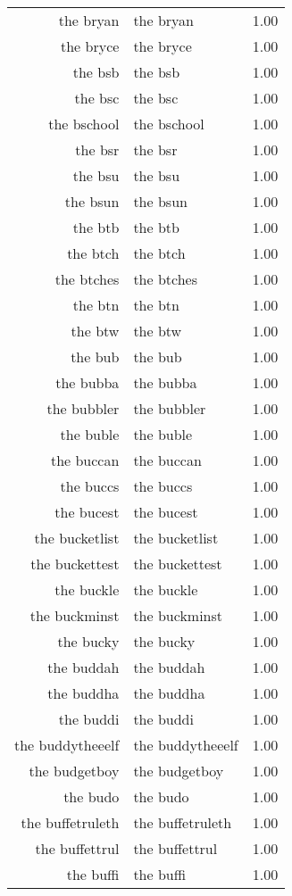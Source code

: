 \begin{table}[ht]
\begin{tabular}{rlr}
  the bryan & the bryan & 1.00 \\ 
  the bryce & the bryce & 1.00 \\ 
  the bsb & the bsb & 1.00 \\ 
  the bsc & the bsc & 1.00 \\ 
  the bschool & the bschool & 1.00 \\ 
  the bsr & the bsr & 1.00 \\ 
  the bsu & the bsu & 1.00 \\ 
  the bsun & the bsun & 1.00 \\ 
  the btb & the btb & 1.00 \\ 
  the btch & the btch & 1.00 \\ 
  the btches & the btches & 1.00 \\ 
  the btn & the btn & 1.00 \\ 
  the btw & the btw & 1.00 \\ 
  the bub & the bub & 1.00 \\ 
  the bubba & the bubba & 1.00 \\ 
  the bubbler & the bubbler & 1.00 \\ 
  the buble & the buble & 1.00 \\ 
  the buccan & the buccan & 1.00 \\ 
  the buccs & the buccs & 1.00 \\ 
  the bucest & the bucest & 1.00 \\ 
  the bucketlist & the bucketlist & 1.00 \\ 
  the buckettest & the buckettest & 1.00 \\ 
  the buckle & the buckle & 1.00 \\ 
  the buckminst & the buckminst & 1.00 \\ 
  the bucky & the bucky & 1.00 \\ 
  the buddah & the buddah & 1.00 \\ 
  the buddha & the buddha & 1.00 \\ 
  the buddi & the buddi & 1.00 \\ 
  the buddytheeelf & the buddytheeelf & 1.00 \\ 
  the budgetboy & the budgetboy & 1.00 \\ 
  the budo & the budo & 1.00 \\ 
  the buffetruleth & the buffetruleth & 1.00 \\ 
  the buffettrul & the buffettrul & 1.00 \\ 
  the buffi & the buffi & 1.00 \\ 

\end{tabular}
\end{table}
